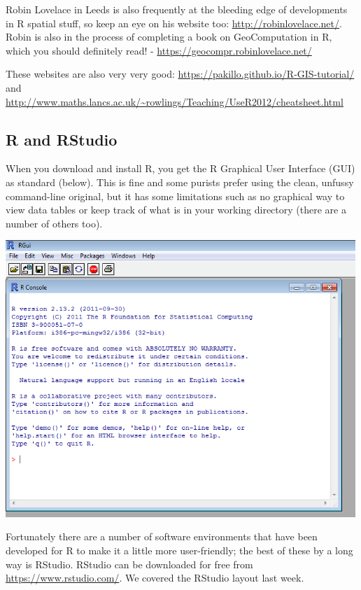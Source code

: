\documentclass[]{book}
\begin{document}
Robin Lovelace in Leeds is also frequently at the bleeding edge of developments in R spatial stuff, so keep an eye on his website too: \url{http://robinlovelace.net/}. Robin is also in the process of completing a book on GeoComputation in R, which you should definitely read! - \url{https://geocompr.robinlovelace.net/}

These websites are also very very good: \url{https://pakillo.github.io/R-GIS-tutorial/} and \url{http://www.maths.lancs.ac.uk/~rowlings/Teaching/UseR2012/cheatsheet.html}

\hypertarget{r-and-rstudio}{%
\subsection{R and RStudio}\label{r-and-rstudio}}

When you download and install R, you get the R Graphical User Interface (GUI) as standard (below). This is fine and some purists prefer using the clean, unfussy command-line original, but it has some limitations such as no graphical way to view data tables or keep track of what is in your working directory (there are a number of others too).

\begin{center}\includegraphics[width=500px]{prac2_images/R} \end{center}

Fortunately there are a number of software environments that have been developed for R to make it a little more user-friendly; the best of these by a long way is RStudio. RStudio can be downloaded for free from \url{https://www.rstudio.com/}. We covered the RStudio layout last week.
\end{document}
